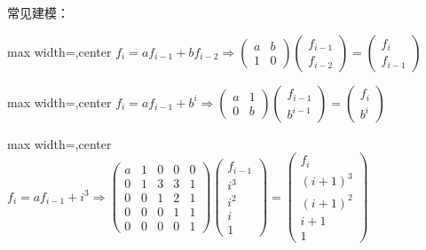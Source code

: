 \documentclass[twocolumn,10pt]{ctexart}
\begin{document}
常见建模：

\begin{adjustbox}{max width=\linewidth,center}
$f_i=af_{i-1}+bf_{i-2}
\Rightarrow
\begin{pmatrix}
a&b\\1&0
\end{pmatrix}
\begin{pmatrix}
f_{i-1}\\f_{i-2}
\end{pmatrix}
=
\begin{pmatrix}
f_i\\f_{i-1}
\end{pmatrix}$
\end{adjustbox}

\begin{adjustbox}{max width=\linewidth,center}
$f_i=af_{i-1}+b^i
\Rightarrow
\begin{pmatrix}
a&1\\0&b
\end{pmatrix}
\begin{pmatrix}
f_{i-1}\\b^{i-1}
\end{pmatrix}
=
\begin{pmatrix}
f_i\\b^i
\end{pmatrix}$
\end{adjustbox}

\begin{adjustbox}{max width=\linewidth,center}
$f_i=af_{i-1}+i^3
\Rightarrow
\begin{pmatrix}
a&1&0&0&0\\
0&1&3&3&1\\
0&0&1&2&1\\
0&0&0&1&1\\
0&0&0&0&1
\end{pmatrix}
\begin{pmatrix}
f_{i-1}\\i^3\\i^2\\i\\1
\end{pmatrix}
=
\begin{pmatrix}
f_i\\(i+1)^3\\(i+1)^2\\i+1\\1
\end{pmatrix}$
\end{adjustbox}
\end{document}
